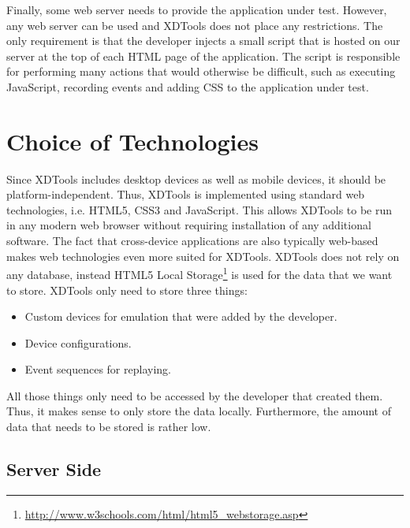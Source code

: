 Finally, some web server needs to provide the application under test. However, any web server can be used and XDTools does not place any restrictions. The only requirement is that the developer injects a small script that is hosted on our server at the top of each HTML page of the application. The script is responsible for performing many actions that would otherwise be difficult, such as executing JavaScript, recording events and adding CSS to the application under test.

\section{Choice of Technologies}

Since XDTools includes desktop devices as well as mobile devices, it should be platform-independent. Thus, XDTools is implemented using standard web technologies, i.e. HTML5, CSS3 and JavaScript. This allows XDTools to be run in any modern web browser without requiring installation of any additional software. The fact that cross-device applications are also typically web-based makes web technologies even more suited for XDTools. XDTools does not rely on any database, instead HTML5 Local Storage\footnote{\url{http://www.w3schools.com/html/html5_webstorage.asp}} is used for the data that we want to store. XDTools only need to store three things:
\begin{itemize}
	\item Custom devices for emulation that were added by the developer.
	\item Device configurations.
	\item Event sequences for replaying.
\end{itemize}
All those things only need to be accessed by the developer that created them. Thus, it makes sense to only store the data locally. Furthermore, the amount of data that needs to be stored is rather low. 

\subsection{Server Side}

